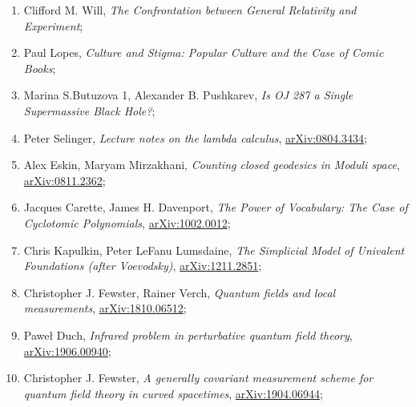 \documentclass[a4paper,11pt]{article}
\begin{document}
\begin{enumerate}
\item Clifford M. Will, \textit{The Confrontation between General
    Relativity and Experiment};



\item Paul Lopes, \textit{Culture and Stigma: Popular Culture and the
    Case of Comic Books};



\item Marina S.Butuzova 1, Alexander B. Pushkarev, \textit{Is OJ 287 a
    Single Supermassive Black Hole?};



\item Peter Selinger, \textit{Lecture notes on the lambda calculus},
  \href{https://arxiv.org/abs/0804.3434v2}{arXiv:0804.3434};



\item Alex Eskin, Maryam Mirzakhani, \textit{Counting closed geodesics
    in Moduli space},
  \href{https://arxiv.org/abs/0811.2362v3}{arXiv:0811.2362};



\item Jacques Carette, James H. Davenport, \textit{The Power of
    Vocabulary: The Case of Cyclotomic Polynomials},
  \href{https://arxiv.org/abs/1002.0012v1}{arXiv:1002.0012};



\item Chris Kapulkin, Peter LeFanu Lumsdaine, \textit{The Simplicial
    Model of Univalent Foundations (after Voevodsky)},
  \href{https://arxiv.org/abs/1211.2851v5}{arXiv:1211.2851};



\item Christopher J. Fewster, Rainer Verch, \textit{Quantum fields and
    local measurements},
  \href{https://arxiv.org/abs/1810.06512}{arXiv:1810.06512};



\item Paweł Duch, \textit{Infrared problem in perturbative quantum
    field theory},
  \href{https://arxiv.org/abs/1906.00940}{arXiv:1906.00940};



\item Christopher J. Fewster, \textit{A generally covariant
    measurement scheme for quantum field theory in curved spacetimes},
  \href{https://arxiv.org/abs/1904.06944v1}{arXiv:1904.06944};




\end{enumerate}
\end{document}
